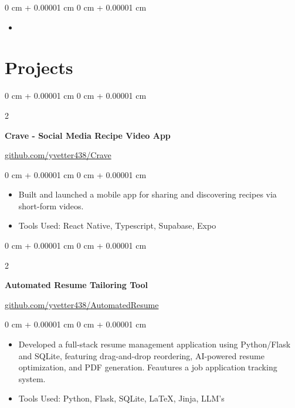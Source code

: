 \documentclass[10pt, letterpaper]{article}
\newenvironment{highlights}{
    \begin{itemize}[
        topsep=0.10 cm,
        parsep=0.10 cm,
        partopsep=0pt,
        itemsep=0pt,
        leftmargin=0 cm + 20pt
    ]
}{
    \end{itemize}
} %
\newenvironment{onecolentry}{
    \begin{adjustwidth}{
        0 cm + 0.00001 cm
    }{
        0 cm + 0.00001 cm
    }
}{
    \end{adjustwidth}
} %
\newenvironment{twocolentry}[2][]{
    \onecolentry
    \def\secondColumn{#2}
    \setcolumnwidth{\fill, 4.5 cm}
    \begin{paracol}{2}
}{
    \switchcolumn \raggedleft \secondColumn
    \end{paracol}
    \endonecolentry
} %
\begin{document}
    \vspace{0.10 cm}
    \begin{onecolentry}
        \begin{highlights}
            \item {}
        \end{highlights}
    \end{onecolentry}

    \section{Projects}

    \begin{twocolentry}{
        \href{https://github.com/yvetter438/Crave}{github.com/yvetter438/Crave}
    }
        \textbf{Crave - Social Media Recipe Video App}
    \end{twocolentry}

    \vspace{0.10 cm}
    \begin{onecolentry}
        \begin{highlights}
            \item Built and launched a mobile app for sharing and discovering recipes via short-form videos.
            \item Tools Used: React Native, Typescript, Supabase, Expo
        \end{highlights}
    \end{onecolentry}

    \vspace{0.2 cm}

    \begin{twocolentry}{
        \href{https://github.com/yvetter438/AutomatedResume}{github.com/yvetter438/AutomatedResume}
    }
        \textbf{Automated Resume Tailoring Tool}
    \end{twocolentry}

    \vspace{0.10 cm}
    \begin{onecolentry}
        \begin{highlights}
            \item Developed a full-stack resume management application using Python/Flask and SQLite, featuring drag-and-drop reordering, AI-powered resume optimization, and PDF generation. Feautures a job application tracking system.
            \item Tools Used: Python, Flask, SQLite, LaTeX, Jinja, LLM's
        \end{highlights}
    \end{onecolentry}
\end{document}
